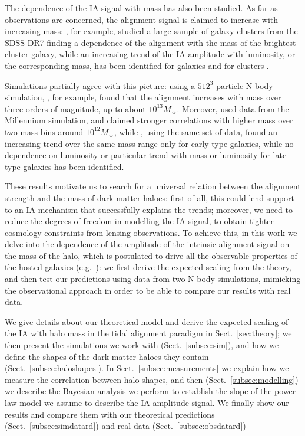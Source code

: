 \documentclass[a4paper,fleqn,usenatbib]{mnras}
\begin{document}
The dependence of the IA signal with mass has also been studied. As far as observations are concerned, the alignment signal is claimed to increase with increasing mass: \citet{Haoetal2011}, for example, studied a large sample of galaxy clusters from the SDSS DR7 finding a dependence of the alignment with the mass of the brightest cluster galaxy, while an increasing trend of the IA amplitude with luminosity, or the corresponding mass, has been identified for galaxies \citep{Joachimietal2011, Singhetal2015} and for clusters \citep{vanUitertJoachimi2017}. 

Simulations partially agree with this picture: using a $512^3$-particle N-body simulation, \citet{Jing2002}, for example, found that the alignment increases with mass over three orders of magnitude, up to about $10^{13} M_{\sun}$. Moreover, \citet{Leeetal2008} used data from the Millennium simulation, and claimed stronger correlations with higher mass over two mass bins around $10^{12} M_{\sun}$, while \citet{Joachimietal2013b}, using the same set of data, found an increasing trend over the same mass range only for early-type galaxies, while no dependence on luminosity or particular trend with mass or luminosity for late-type galaxies has been identified. 

These results motivate us to search for a universal relation between the alignment strength and the mass of dark matter haloes: first of all, this could lend support to an IA mechanism that successfully explains the trends; moreover, we need to reduce the degrees of freedom in modelling the IA signal, to obtain tighter cosmology constraints from lensing observations. To achieve this, in this work we delve into the dependence of the amplitude of the intrinsic alignment signal on the mass of the halo, which is postulated to drive all the observable properties of the hosted galaxies (e.g.\ \citealt{Joachimietal2015}): we first derive the expected scaling from the theory, and then test our predictions using data from two N-body simulations, mimicking the observational approach in order to be able to compare our results with real data.

We give details about our theoretical model and derive the expected scaling of the IA with halo mass in the tidal alignment paradigm in Sect.~\ref{sec:theory}; we then present the simulations we work with (Sect.~\ref{subsec:sim}), and how we define the shapes of the dark matter haloes they contain (Sect.~\ref{subsec:haloshapes}). In Sect.~\ref{subsec:measurements} we explain how we measure the correlation between halo shapes, and then (Sect.~\ref{subsec:modelling}) we describe the Bayesian analysis we perform to establish the slope of the power-law model we assume to describe the IA amplitude signal. We finally show our results and compare them with our theoretical predictions (Sect.~\ref{subsec:simdatard}) and real data (Sect.~\ref{subsec:obsdatard}) 
\end{document}
